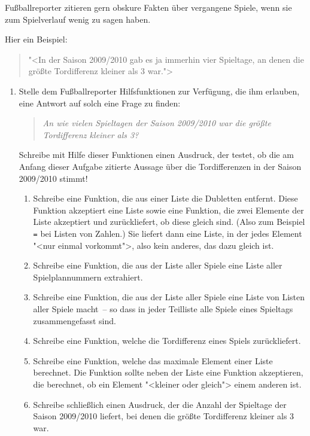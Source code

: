 \begin{aufgabe}
  Fußballreporter zitieren gern obskure Fakten über
  vergangene Spiele, wenn sie zum Spielverlauf wenig zu sagen haben.

  Hier ein Beispiel:
  \begin{quote}
    "<In der Saison 2009/2010 gab es ja immerhin vier Spieltage, an
    denen die größte Tordifferenz kleiner als 3 war.">
  \end{quote}
\begin{enumerate}
\item Stelle dem Fußballreporter Hilfsfunktionen zur Verfügung,
  die ihm erlauben, eine Antwort auf solch eine Frage zu
  finden:
  \begin{quote}
    \emph{An wie vielen Spieltagen der Saison 2009/2010 war die größte
    Tordifferenz kleiner als 3?}
  \end{quote}
  Schreibe mit Hilfe dieser Funktionen einen Ausdruck, der
  testet, ob die am Anfang dieser Aufgabe zitierte Aussage über die
  Tordifferenzen in der Saison 2009/2010 stimmt!

  \begin{enumerate}
  \item Schreibe eine Funktion, die aus einer Liste die Dubletten
    entfernt.  Diese Funktion akzeptiert eine Liste sowie eine
    Funktion, die zwei Elemente der Liste akzeptiert und
    zurückliefert, ob diese gleich sind.  (Also zum Beispiel
    \lstinline{=} bei Listen von Zahlen.)  Sie liefert dann eine Liste,
    in der jedes Element "<nur einmal vorkommt">, also kein anderes,
    das dazu gleich ist.
  \item Schreibe eine Funktion, die aus der Liste aller Spiele
    eine Liste aller Spielplannummern extrahiert.
  \item Schreibe eine Funktion, die aus der Liste aller Spiele
    eine Liste von Listen aller Spiele macht~-- so dass in jeder
    Teilliste alle Spiele eines Spieltags zusammengefasst sind.
  \item Schreibe eine Funktion, welche die Tordifferenz eines
    Spiels zurückliefert.
  \item Schreibe eine Funktion, welche das maximale Element einer
    Liste berechnet.  Die Funktion sollte neben der Liste eine
    Funktion akzeptieren, die berechnet, ob ein Element "<kleiner oder
    gleich"> einem anderen ist.
  \item Schreibe schließlich einen Ausdruck, der die Anzahl der
    Spieltage der Saison 2009/2010 liefert, bei denen die größte
    Tordifferenz kleiner als 3 war.
  \end{enumerate}


\end{enumerate}
\end{aufgabe}
